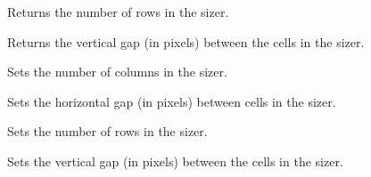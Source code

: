 
Returns the number of rows in the sizer.


\label{wxgridsizergetvgap}


Returns the vertical gap (in pixels) between the cells in the sizer.


\label{wxgridsizersetcols}


Sets the number of columns in the sizer.


\label{wxgridsizersethgap}


Sets the horizontal gap (in pixels) between cells in the sizer.


\label{wxgridsizersetrows}


Sets the number of rows in the sizer.


\label{wxgridsizersetvgap}


Sets the vertical gap (in pixels) between the cells in the sizer.




